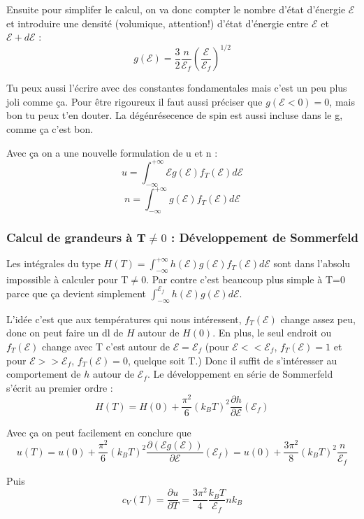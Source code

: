 \documentclass[a4paper]{report}
\begin{document}
  Ensuite pour simplifer le calcul, on va donc compter le nombre d'état d'énergie $\mathcal{E}$ et introduire une densité (volumique, attention!) d'état d'énergie entre $\mathcal{E}$ et $\mathcal{E}+d\mathcal{E}$ : $$g(\mathcal{E})=\frac{3}{2}\frac{n}{\mathcal{E}_f}\left(\frac{\mathcal{E}}{\mathcal{E}_f}\right)^{1/2}$$
  
  Tu peux aussi l'écrire avec des constantes fondamentales mais c'est un peu plus joli comme ça. Pour être rigoureux il faut aussi préciser que $g(\mathcal{E} < 0) =0$, mais bon tu peux t'en douter. La dégénrésecence de spin est aussi incluse dans le g, comme ça c'est bon.
  
  Avec ça on a une nouvelle formulation de u et n : $$u=\int_{-\infty}^{+\infty} \mathcal{E} g(\mathcal{E}) f_T(\mathcal{E}) d\mathcal{E} $$ $$n=\int_{-\infty}^{+\infty} g(\mathcal{E}) f_T(\mathcal{E}) d\mathcal{E} $$
  
  \subsubsection{Calcul de grandeurs à T$\neq 0$ : Développement de Sommerfeld}
  
  Les intégrales du type $H(T)=\int_{-\infty}^{+\infty} h (\mathcal{E}) g(\mathcal{E}) f_T(\mathcal{E}) d\mathcal{E}$ sont dans l'absolu impossible à calculer pour T$\neq 0$. Par contre c'est beaucoup plus simple à T=0 parce que ça devient simplement $\int_{-\infty}^{\mathcal{E}_f} h(\mathcal{E}) g(\mathcal{E})d\mathcal{E}$. 
  
  L'idée c'est que aux températures qui nous intéressent, $f_T(\mathcal{E})$ change assez peu, donc on peut faire un dl de $H$ autour de $H(0)$. En plus, le seul endroit ou $f_T(\mathcal{E})$ change avec T c'est autour de $\mathcal{E}=\mathcal{E}_f$ (pour $\mathcal{E}<<\mathcal{E}_f$, $f_T(\mathcal{E})=1$ et pour $\mathcal{E}>>\mathcal{E}_f$, $f_T(\mathcal{E})=0$, quelque soit T.) Donc il suffit de s'intéresser au comportement de $h$ autour de $\mathcal{E}_f$. Le développement en série de Sommerfeld s'écrit au premier ordre : $$H(T)=H(0)+\frac{\pi^2}{6}(k_B T)^2 \frac{\partial h}{\partial \mathcal{E}}(\mathcal{E}_f)$$
  
  Avec ça on peut facilement en conclure que $$u(T) = u(0) + \frac{\pi^2}{6}(k_B T)^2 \frac{\partial (\mathcal{E}g(\mathcal{E}))}{\partial \mathcal{E}}(\mathcal{E}_f) = u(0) + \frac{3 \pi^2}{8} (k_B T)^2 \frac{n}{\mathcal{E}_f}$$
  
  Puis $$c_V(T)=\frac{\partial u}{\partial T}= \frac{3 \pi^2}{4} \frac{k_BT}{\mathcal{E}_f} nk_B$$
  
\end{document}
